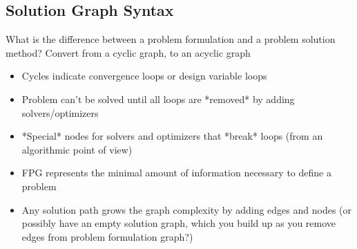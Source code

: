     \subsection{Solution Graph Syntax}
    What is the difference between a problem formulation and a problem solution method? Convert from a cyclic graph, to an acyclic graph
    \begin{itemize}
        \item Cycles indicate convergence loops or design variable loops
        \item Problem can't be solved until all loops are *removed* by adding solvers/optimizers
        \item *Special* nodes for solvers and optimizers that *break* loops (from an algorithmic point of view)
        \item FPG represents the minimal amount of information necessary to define a problem
        \item Any solution path grows the graph complexity by adding edges and nodes (or possibly have an empty solution graph, which you build up
        as you remove edges from problem formulation graph?)
    \end{itemize}
